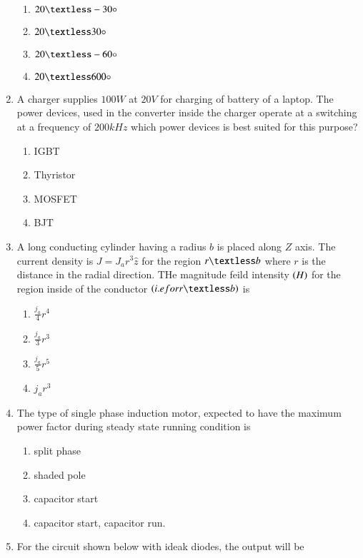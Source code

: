 \documentclass[journal]{IEEEtran}
\begin{document}
\begin{enumerate}
\begin{figure}[!ht]
\label{fig:my_label}
\end{figure}
\begin{enumerate}
    \item $20 \textless -30\circ$
    \item $20 \textless 30\circ$
    \item $20 \textless -60\circ$
    \item $20 \textless 600\circ$
\end{enumerate}
\item A charger supplies $100W$ at $20V$ for charging of battery of a laptop. The power devices, used in the converter inside the charger operate at a switching at a frequency of $200kHz$ which power devices is best suited for this purpose?
\begin{enumerate}
    \item IGBT
    \item Thyristor
    \item MOSFET
    \item BJT
\end{enumerate}
\item A long conducting cylinder having a radius $b$ is placed along $Z$ axis. The current density is $J=J_ar^3\hat{z}$ for the region $r\textless b$ where $r$ is the distance in the radial direction. THe magnitude feild intensity $\left(H\right)$ for the region inside of the conductor $\brak{i.e for r \textless b}$ is
\begin{enumerate}
    \item $\frac{j_a}{4}r^4$
    \item $\frac{j_a}{3}r^3$
    \item $\frac{j_a}{5}r^5$
    \item $j_ar^3$
\end{enumerate}
\item The type of single phase induction motor, expected to have the maximum power factor during steady state running condition is 
\begin{enumerate}
    \item split phase 
    \item shaded pole 
    \item capacitor start
    \item capacitor start, capacitor run.
\end{enumerate}
\item For the circuit shown below with ideak diodes, the output will be \\\\\\\\\\\\
\begin{figure}[!ht]
\centering
{}
\end{figure}
\end{enumerate}
\end{document}
